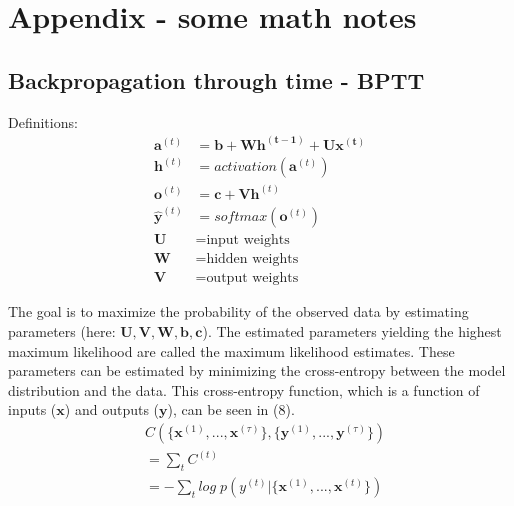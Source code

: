 \documentclass[12pt]{article}
\begin{document}
\section*{Appendix - some math notes}

\subsection*{Backpropagation through time - BPTT}
Definitions:
\begin{align}
    \mathbf{a}^{(t)} &= \mathbf{b + Wh^{(t-1)} + Ux^{(t)}} \\
    \mathbf{h}^{(t)} &= activation(\mathbf{a}^{(t)})\\
    \mathbf{o}^{(t)} &= \mathbf{c + Vh}^{(t)} \\
    \mathbf{\hat{y}}^{(t)} &= softmax(\mathbf{o}^{(t)}) \\
    \mathbf{U} &= \text{input weights} \\
    \mathbf{W} &= \text{hidden weights} \\
    \mathbf{V} &= \text{output weights}
\end{align}


The goal is to maximize the probability of the observed data by estimating parameters (here: $\mathbf{U, V, W, b, c}$). The estimated parameters yielding the highest maximum likelihood are called the maximum likelihood estimates. These parameters can be estimated by minimizing the cross-entropy between the model distribution and the data. %
This cross-entropy function, which is a function of inputs ($\mathbf{x}$) and outputs ($\mathbf{y}$), can be seen in (8).
\begin{align}
    &C\left(\{\mathbf{x}^{(1)},...,\mathbf{x}^{(\tau)}\}, \{\mathbf{y}^{(1)},...,\mathbf{y}^{(\tau)}\}\right) \\
    &= \sum_t C^{(t)} \\
    &= -\sum_t log\;p\left(y^{(t)}|\{\mathbf{x}^{(1)},...,\mathbf{x}^{(t)}\}\right) \\
\end{align}
\end{document}
